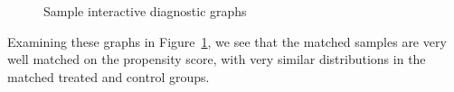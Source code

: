 \documentclass[oneside,letterpaper,titlepage]{article}
\begin{document}
\begin{figure}[ph]
  \begin{center}
    \hfill
    \caption{Sample interactive diagnostic graphs}
    \label{f2diags}
  \end{center}
\end{figure}

Examining these graphs in Figure~\ref{f2diags}, we see that the
matched samples are very well matched on the propensity score, with
very similar distributions in the matched treated and control groups.
\end{document}
